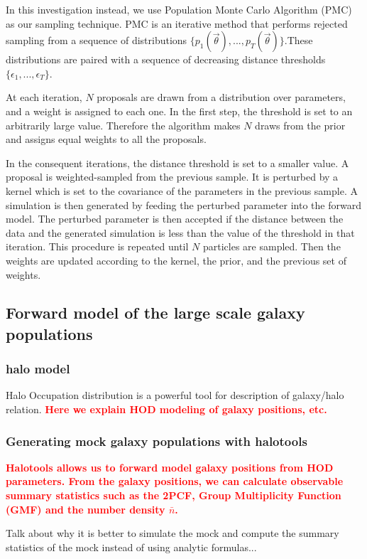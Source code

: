 \documentclass[12pt, preprint]{aastex}
\newcommand{\todo}[1]{{\bf \textcolor{red}{ #1}}}
\newcommand{\pars}{\vec{\theta}}
\begin{document}
In this investigation instead, we use Population Monte Carlo Algorithm (PMC) as our sampling technique. PMC is an iterative method that performs rejected sampling from a sequence of distributions $\{p_{1}(\pars),...,p_{T}(\pars)\}$.These distributions are paired with a sequence of decreasing distance thresholds $\{\epsilon_{1} , ... , \epsilon_{T}\}$.

At each iteration, $N$ proposals are drawn from a distribution over parameters, and a weight is assigned to each one. In the first step, the threshold is set to an arbitrarily large value. Therefore the algorithm makes $N$ draws from the prior and assigns equal weights to all the proposals.

In the consequent iterations, the distance threshold is set to a smaller value. A proposal is weighted-sampled from the previous sample. It is perturbed by a kernel which is set to the covariance of the parameters in the previous sample. A simulation is then generated by feeding the perturbed parameter into the forward model. The perturbed parameter is then accepted if the distance between the data and the generated simulation is less than the value of the threshold in that iteration. This procedure is repeated until $N$ particles are sampled. Then the weights are updated according to the kernel, the prior, and the previous set of weights.

\subsection{Forward model of the large scale galaxy populations}\label{sec:halo}
\subsubsection{halo model}
Halo Occupation distribution is a powerful tool for description of galaxy/halo relation. \todo{Here we explain HOD modeling of galaxy positions, etc.}
\subsubsection{Generating mock galaxy populations with halotools}

\todo{Halotools allows us to forward model galaxy positions from HOD parameters. From the galaxy positions, we can calculate observable summary statistics such as the 2PCF, Group Multiplicity Function (GMF) and the number density $\bar{n}$.}

Talk about why it is better to simulate the mock and compute the summary statistics of the mock instead of 
using analytic formulas...
\end{document}
